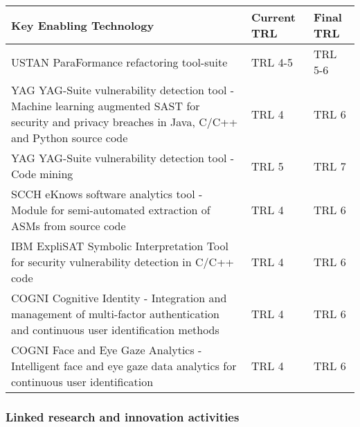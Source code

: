 \documentclass[a4paper,11pt]{article}
\begin{document}
\begin{center}
  \begin{tabular}{|p{4.9in}|l|l|}
    \hline
    \textbf{Key Enabling Technology} & \textbf{Current TRL} & \textbf{Final TRL} \\
    \hline
    \hline USTAN ParaFormance refactoring tool-suite & TRL 4-5 & TRL 5-6 \\  
    \hline YAG YAG-Suite vulnerability detection tool - Machine learning augmented SAST for security and privacy breaches in Java, C/C++ and Python source code & TRL 4 & TRL 6 \\  
    \hline YAG YAG-Suite vulnerability detection tool - Code mining & TRL 5 & TRL 7 \\  
    \hline SCCH eKnows software analytics tool - Module for semi-automated extraction of ASMs from source code & TRL 4 & TRL 6 \\
    \hline IBM ExpliSAT Symbolic Interpretation Tool for security vulnerability detection in C/C++ code & TRL 4 & TRL 6 \\
    \hline COGNI Cognitive Identity - Integration and management of multi-factor authentication and continuous user identification methods & TRL 4 & TRL 6 \\
    \hline COGNI Face and Eye Gaze Analytics - Intelligent face and eye gaze data analytics for continuous user identification & TRL 4 & TRL 6 \\
    \hline
  \end{tabular}
\end{center}



\subsubsection{Linked research and innovation activities}
\label{projects}

\end{document}
